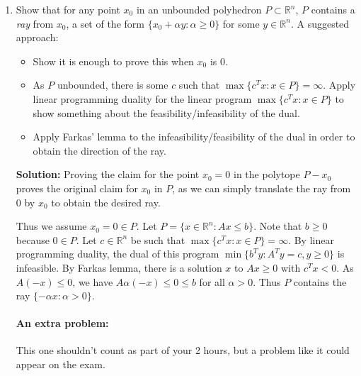 \documentclass[12pt]{article}
\begin{document}
\begin{enumerate}


\item Show that for any point $x_0$ in an unbounded polyhedron $P \subset \mathbb{R}^n$, $P$ contains a \emph{ray} from $x_0$, a set of the form $\{x_0 + \alpha y: \alpha \geq 0\}$ for some $y \in \mathbb{R}^n$. A suggested approach:
\begin{itemize}
\item Show it is enough to prove this when $x_0$ is $0$.
\item As $P$ unbounded, there is some $c$ such that $\max\{c^T x: x \in P\} = \infty$. Apply linear programming duality for the linear program $\max\{c^T x: x \in P\}$ to show something about the feasibility/infeasibility of the dual.
\item Apply Farkas' lemma to the infeasibility/feasibility of the dual in order to obtain the direction of the ray.
\end{itemize}

\textbf{ Solution: } Proving the claim for the point $x_0 = 0$ in the polytope $P - x_0$ proves the original claim for $x_0$ in $P$, as we can simply translate the ray from $0$ by $x_0$ to obtain the desired ray. 

Thus we assume $x_0 = 0 \in P$. Let $P = \{x \in \mathbb{R}^n: Ax \leq b\}$. Note that $b \geq 0$ because $0 \in P$. Let $c \in \mathbb{R}^n$ be such that $\max\{c^T x: x \in P\} = \infty$. By linear programming duality, the dual of this program $\min\{b^T y: A^T y = c, y \geq 0\}$ is infeasible. By Farkas lemma, there is a solution $x$ to $Ax \geq 0$ with $c^T x < 0$. As $A (-x) \leq 0$, we have $A \alpha(- x) \leq 0 \leq b$ for all $\alpha > 0$. Thus $P$ contains the ray $\{- \alpha x : \alpha > 0\}$.

 \paragraph{An extra problem: }
This one shouldn't count as part of your 2 hours, but a problem like it could appear on the exam.


\end{enumerate}
\end{document}
